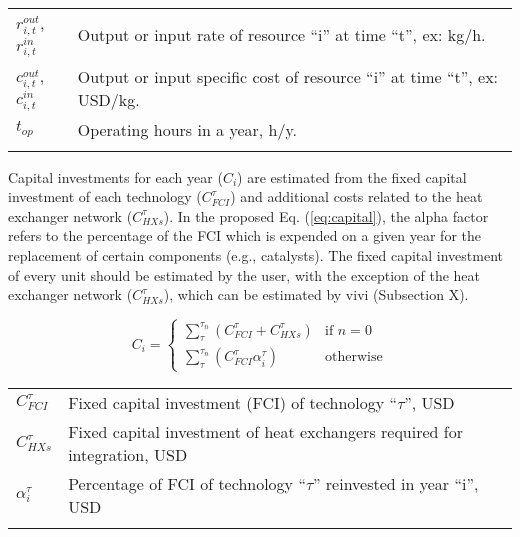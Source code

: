 \documentclass[10pt,twoside,a4paper]{report}
\begin{document}
\begin{tabular}[h]{ll}
  $r_{i,t}^{out}$,$r_{i,t}^{in}$ & Output or input rate of resource ``i'' at time ``t'', ex: kg/h.\\
  $c_{i,t}^{out}$,$c_{i,t}^{in}$ & Output or input specific cost of resource ``i'' at time ``t'', ex: USD/kg.\\
  $t_{op}$ & Operating hours in a year, h/y.\\
  \\
\end{tabular}




Capital investments for each year ($C_i$) are estimated from the fixed
capital investment of each technology ($C_{FCI}^\tau$) and additional
costs related to the heat exchanger network ($C_{HXs}^\tau$). In the
proposed Eq. (\ref{eq:capital}), the alpha factor refers to the
percentage of the FCI which is expended on a given year for the
replacement of certain components (e.g., catalysts). The fixed capital
investment of every unit should be estimated by the user, with the
exception of the heat exchanger network ($C_{HXs}^\tau$), which can be
estimated by vivi (Subsection X).

\begin{equation}
  \label{eq:capital}
  C_i =
  \begin{cases}
    \sum_\tau^{\tau_n} (C_{FCI}^\tau+C_{HXs}^\tau) &\text{if $n=0$}\\
    \sum_\tau^{\tau_n} (C_{FCI}^\tau\alpha_{i}^\tau) &\text{otherwise}
  \end{cases}
\end{equation}

\begin{tabular}[h]{ll}
  $C_{FCI}^\tau$ & Fixed capital investment (FCI) of technology ``$\tau$'', USD\\
  $C_{HXs}^\tau $ & Fixed capital investment of heat exchangers required for integration, USD \\
  $\alpha_i^\tau$ & Percentage of FCI of technology ``$\tau$'' reinvested in year ``i'', USD\\
  \\
\end{tabular}
\end{document}
